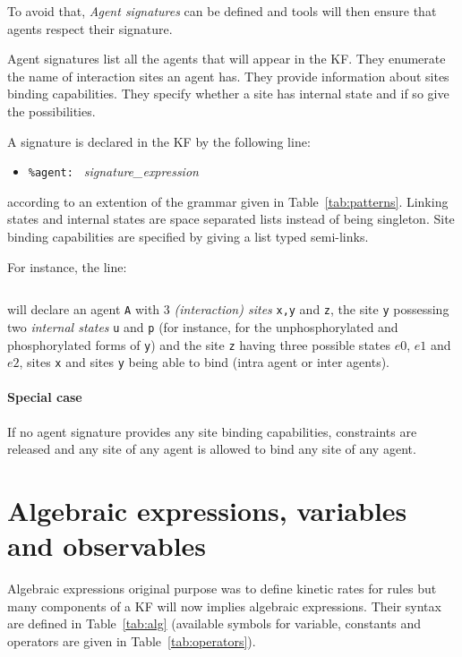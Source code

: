\documentclass[11pt]{book}
\def\ttt#1{\texttt{#1}}
\def\ITE#1{\begin{itemize}#1\end{itemize}}
\begin{document}
To avoid that, \emph{Agent signatures} can be
defined and tools will then ensure that agents respect their
signature.

Agent signatures list all the agents that will appear in the
KF. They enumerate the name of interaction sites
an agent has. They provide information about sites binding capabilities.
They specify whether a site has internal state and if so give the possibilities.

A signature is declared in the
KF by the following line: \ITE{
\item[] \ttt{\%agent: } \textit{signature\_expression} } according to
an extention of the grammar given in Table~\ref{tab:patterns}. Linking
states and internal states are space separated lists instead of being
singleton. Site binding capabilities are specified by giving a list
typed semi-links.

For instance, the line:
\begin{lstlisting}[language=kappa]
%agent: A(x[y.A], y{u p}[x.A], z{e0 e1 e2}) // Signature of agent A
\end{lstlisting}
will declare an agent \ttt{A} with 3 \emph{(interaction) sites}
\ttt{x,y} and \ttt{z}, the site \ttt{y} possessing two \emph{internal
  states} \ttt{u} and \ttt{p} (for instance, for
the unphosphorylated and phosphorylated forms of \ttt{y}) and the site
\ttt{z} having three possible states $e0$, $e1$ and $e2$, sites
\ttt{x} and sites \ttt{y} being able to bind (intra agent or inter
agents).

\paragraph{Special case} If no agent signature provides any site binding capabilities,
constraints are released and any site of any agent is allowed to bind
any site of any agent.

\section{Algebraic expressions, variables and observables}\label{sec:var}

Algebraic expressions original purpose was
to define kinetic rates for rules but many
components of a KF will now implies algebraic
expressions. Their syntax are defined in Table~\ref{tab:alg}
(available symbols for variable, constants and operators are given in
Table~\ref{tab:operators}).
\end{document}
